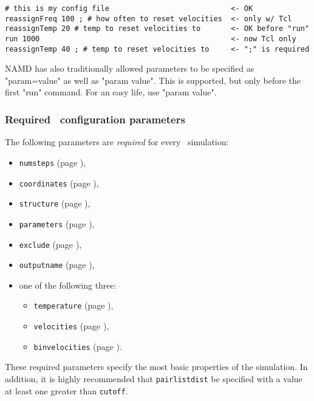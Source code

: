 \begin{verbatim}
# this is my config file                            <- OK
reassignFreq 100 ; # how often to reset velocities  <- only w/ Tcl
reassignTemp 20 # temp to reset velocities to       <- OK before "run"
run 1000                                            <- now Tcl only
reassignTemp 40 ; # temp to reset velocities to     <- ";" is required
\end{verbatim}

NAMD has also traditionally allowed parameters to be specified as
"param=value" as well as "param value".  This is supported, but only
before the first "run" command.  For an easy life, use "param value".

\subsubsection{Required \NAMD\ configuration parameters}
\label{section:requiredparams}

The following parameters are {\em required} for every
\NAMD\ simulation:

\begin{itemize}

\item
{\tt numsteps} (page \pageref{param:numsteps}),

\item
{\tt coordinates} (page \pageref{param:coordinates}),

\item
{\tt structure} (page \pageref{param:structure}),

\item
{\tt parameters} (page \pageref{param:parameters}),

\item
{\tt exclude} (page \pageref{param:exclude}), 

\item
{\tt outputname} (page \pageref{param:outputname}), 

\item
one of the following three:
\begin{itemize}
\item
{\tt temperature} (page \pageref{param:temperature}),

\item
{\tt velocities} (page \pageref{param:velocities}),

\item
{\tt binvelocities} (page \pageref{param:binvelocities}).
\end{itemize}

\end{itemize}

\noindent These required parameters specify the most basic properties of
the simulation.  %
In addition, it is highly recommended that 
{\tt pairlistdist} be specified with a 
value at least one greater than {\tt cutoff}.

